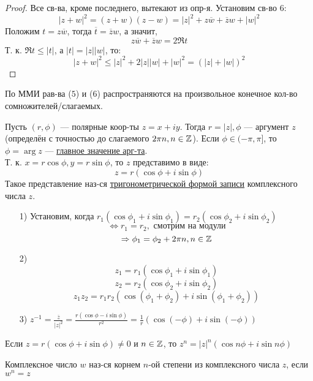 \begin{proof}
Все св-ва, кроме последнего, вытекают из опр-я. Установим св-во $6$:
\[
\left|z + w\right|^{2} = (z + w)(z - w) = \left|z\right|^{2} + z\overline{w} + \overline{z}w + \left|w\right|^{2}
\]
Положим $t = z\overline{w}$, тогда $\overline{t} = \overline{z}w$, а значит,
\[
z\overline{w} + \overline{z}w = 2\Re t
\]
Т. к. $\Re t \leq \left|t\right|$, а $\left|t\right| = \left|z\right|\left|w\right|$, то:
\[
  \left|z + w\right|^{2} \leq \left|z\right|^{2} + 2 \left|z\right|\left|w\right| + \left|w\right|^{2} = (\left|z\right| + \left|w\right|)^{2}
\]
\end{proof}
\begin{note}
По ММИ рав-ва ($5$) и ($6$) распространяются на произвольное конечное кол-во сомножителей/слагаемых.
\end{note}
Пусть $(r, \phi)$ --- полярные коор-ты $z = x + iy$. Тогда $r = \left|z\right|, \phi$ --- аргумент $z$ (определён с точностью до слагаемого $2\pi n, n \in \mathbb{Z}$). Если $\phi \in (-\pi, \pi]$, то $\phi = \arg z$ --- \underline{главное значение арг-та}. \\
Т. к. $x = r\cos\phi, y = r\sin\phi$, то $z$ представимо в виде:
\[
  z = r(\cos\phi + i\sin\phi)
\]
Такое представление наз-ся \underline{тригонометрической формой записи} комплексного числа $z$.
\begin{note}
  \begin{itemize}
    \item [1) ]
Установим, когда $r_1(\cos \phi_1 + i\sin\phi_1) = r_2(\cos\phi_2 + i\sin\phi_2)$
\[
\iff r_1 = r_2, \text{ смотрим на модули}
\]
\[
\Rightarrow \phi_1 = \phi_2 + 2\pi n, n \in \mathbb{Z}
\]
  \item [2) ]
    \[
      z_1 = r_1(\cos\phi_1 + i\sin\phi_1)
    \]
    \[
      z_2 = r_2(\cos\phi_2 + i \sin\phi_2)
    \]
    \[
    z_1 z_2 = r_1r_2 (\cos(\phi_1 + \phi_2) + i\sin(\phi_1 + \phi_2))
    \]
  \item [3) ] $z^{-1} = \frac{\overline{z}}{\left|z\right|^{2}} = \frac{r(\cos\phi - i\sin\phi)}{r^{2}} = \frac{1}{r}(\cos(-\phi) + i\sin(-\phi))$
  \end{itemize}
\end{note}
\begin{statement}
  Если $z = r(\cos\phi + i\sin\phi) \neq 0$ и $n \in \mathbb{Z}$, то $z^{n} = \left|z\right|^{n}(\cos n\phi + i\sin n\phi)$
\end{statement}
\begin{definition}
Комплексное число $w$ наз-ся корнем $n$-ой степени из комплексного числа $z$, если $w^{n} = z$
\end{definition}
